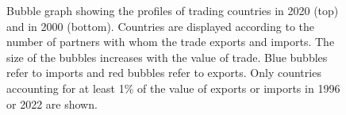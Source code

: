 \documentclass[
  authoryear,
  review,
  3p]{elsarticle}
\begin{document}
\begin{figure}[p]


\caption{\label{fig-countries-profiles}Bubble graph showing the profiles
of trading countries in 2020 (top) and in 2000 (bottom). Countries are
displayed according to the number of partners with whom the trade
exports and imports. The size of the bubbles increases with the value of
trade. Blue bubbles refer to imports and red bubbles refer to exports.
Only countries accounting for at least 1\% of the value of exports or
imports in 1996 or 2022 are shown.}

\end{figure}%
\end{document}
